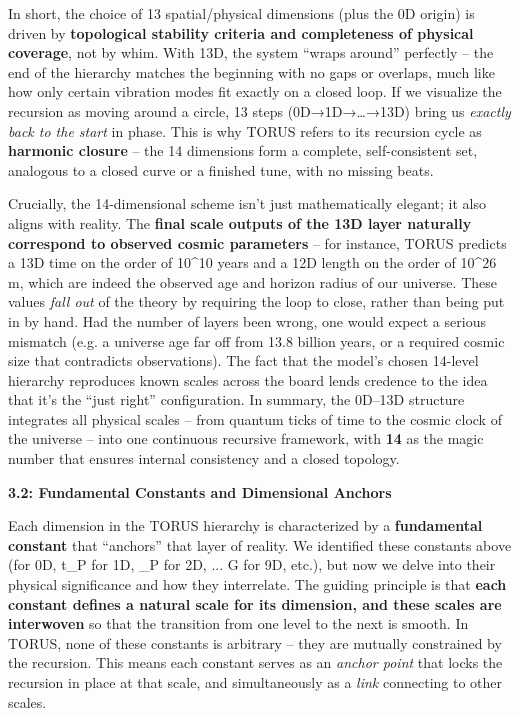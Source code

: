 \documentclass[
]{article}
\begin{document}
In short, the choice of 13 spatial/physical dimensions (plus the 0D
origin) is driven by \textbf{topological stability criteria and
completeness of physical coverage}, not by whim\hspace{0pt}. With 13D,
the system ``wraps around'' perfectly -- the end of the hierarchy
matches the beginning with no gaps or overlaps, much like how only
certain vibration modes fit exactly on a closed loop\hspace{0pt}. If we
visualize the recursion as moving around a circle, 13 steps
(0D→1D→\ldots→13D) bring us \emph{exactly back to the start} in phase.
This is why TORUS refers to its recursion cycle as \textbf{harmonic
closure} -- the 14 dimensions form a complete, self-consistent set,
analogous to a closed curve or a finished tune, with no missing beats.

Crucially, the 14-dimensional scheme isn't just mathematically elegant;
it also aligns with reality. The \textbf{final scale outputs of the 13D
layer naturally correspond to observed cosmic parameters} -- for
instance, TORUS predicts a 13D time on the order of 10\^{}10 years and a
12D length on the order of 10\^{}26 m, which are indeed the observed age
and horizon radius of our universe\hspace{0pt}. These values \emph{fall
out} of the theory by requiring the loop to close, rather than being put
in by hand. Had the number of layers been wrong, one would expect a
serious mismatch (e.g. a universe age far off from 13.8 billion years,
or a required cosmic size that contradicts observations). The fact that
the model's chosen 14-level hierarchy reproduces known scales across the
board lends credence to the idea that it's the ``just right''
configuration. In summary, the 0D--13D structure integrates all physical
scales -- from quantum ticks of time to the cosmic clock of the universe
-- into one continuous recursive framework, with \textbf{14} as the
magic number that ensures internal consistency and a closed
topology\hspace{0pt}.

\textbf{3.2: Fundamental Constants and Dimensional Anchors}

Each dimension in the TORUS hierarchy is characterized by a
\textbf{fundamental constant} that ``anchors'' that layer of reality. We
identified these constants above (\alpha for 0D,
t_{P}{} for 1D,
\ell_{P}{} for 2D, ... G
for 9D, etc.), but now we delve into their physical significance and how
they interrelate. The guiding principle is that \textbf{each constant
defines a natural scale for its dimension, and these scales are
interwoven} so that the transition from one level to the next is smooth.
In TORUS, none of these constants is arbitrary -- they are mutually
constrained by the recursion. This means each constant serves as an
\emph{anchor point} that locks the recursion in place at that scale, and
simultaneously as a \emph{link} connecting to other scales.
\end{document}
